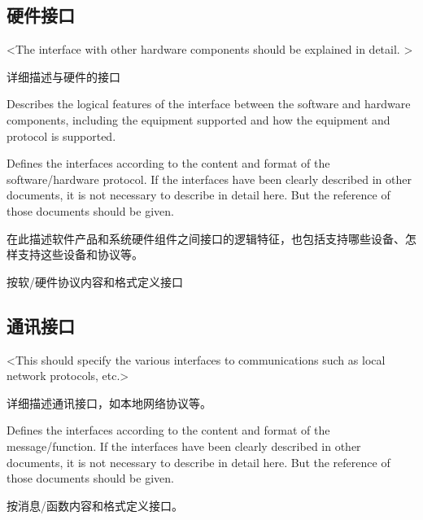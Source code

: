 \subsection{硬件接口}
<The interface with other hardware components should be explained in detail. >

详细描述与硬件的接口

Describes the logical features of the interface between the software and hardware components, including the equipment supported and how the equipment and protocol is supported. 

Defines the interfaces according to the content and format of the software/hardware protocol. If the interfaces have been clearly described in other documents, it is not necessary to describe in detail here. But the reference of those documents should be given.

在此描述软件产品和系统硬件组件之间接口的逻辑特征，也包括支持哪些设备、怎样支持这些设备和协议等。
 
按软/硬件协议内容和格式定义接口

\subsection{通讯接口}
<This should specify the various interfaces to communications such as local network protocols, etc.>

详细描述通讯接口，如本地网络协议等。

Defines the interfaces according to the content and format of the message/function. If the interfaces have been clearly described in other documents, it is not necessary to describe in detail here. But the reference of those documents should be given.

按消息/函数内容和格式定义接口。
